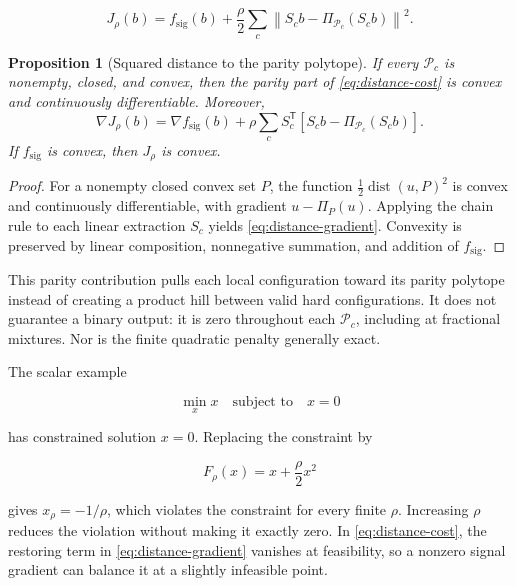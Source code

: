 \documentclass[11pt]{article}
\newtheorem{proposition}{Proposition}
\theoremstyle{remark}
\newcommand{\Pc}{\mathcal{P}_c}
\newcommand{\proj}[2]{\Pi_{#1}\!\left(#2\right)}
\newcommand{\norm}[1]{\left\lVert#1\right\rVert}
\newcommand{\trans}{\mathsf{T}}
\begin{document}
\begin{equation}
J_\rho(b)=
f_{\mathrm{sig}}(b)
+\frac{\rho}{2}\sum_c
\norm{S_cb-\proj{\Pc}{S_cb}}^2.
\label{eq:distance-cost}
\end{equation}

\begin{proposition}[Squared distance to the parity polytope]
If every $\Pc$ is nonempty, closed, and convex, then the parity part of
\cref{eq:distance-cost} is convex and continuously differentiable.  Moreover,
\begin{equation}
\nabla J_\rho(b)=
\nabla f_{\mathrm{sig}}(b)
+\rho\sum_c S_c^{\trans}
\left[S_cb-\proj{\Pc}{S_cb}\right].
\label{eq:distance-gradient}
\end{equation}
If $f_{\mathrm{sig}}$ is convex, then $J_\rho$ is convex.
\end{proposition}

\begin{proof}
For a nonempty closed convex set $P$, the function
$\tfrac12\operatorname{dist}(u,P)^2$ is convex and continuously
differentiable, with gradient $u-\Pi_P(u)$.  Applying the chain rule to each
linear extraction $S_c$ yields \cref{eq:distance-gradient}.  Convexity is
preserved by linear composition, nonnegative summation, and addition of
$f_{\mathrm{sig}}$.
\end{proof}

This parity contribution pulls each local configuration toward its parity
polytope instead of creating a product hill between valid hard
configurations.  It does not guarantee a binary output: it is zero throughout
each $\Pc$, including at fractional mixtures.  Nor is the finite quadratic
penalty generally exact.

The scalar example

\begin{equation}
\min_x x\quad\text{subject to}\quad x=0
\end{equation}

has constrained solution $x=0$.  Replacing the constraint by

\begin{equation}
F_\rho(x)=x+\frac{\rho}{2}x^2
\end{equation}

gives $x_\rho=-1/\rho$, which violates the constraint for every finite
$\rho$.  Increasing $\rho$ reduces the violation without making it exactly
zero.  In \cref{eq:distance-cost}, the restoring term in
\cref{eq:distance-gradient} vanishes at feasibility, so a nonzero signal
gradient can balance it at a slightly infeasible point.
\end{document}
